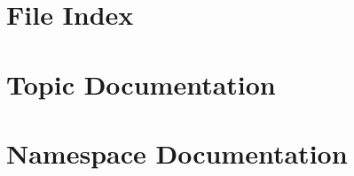 \documentclass[twoside]{book}
\newcommand{\+}{\discretionary{\mbox{\scriptsize$\hookleftarrow$}}{}{}}
\begin{document}
\chapter{File Index}

\chapter{Topic Documentation}







\chapter{Namespace Documentation}










\end{document}
